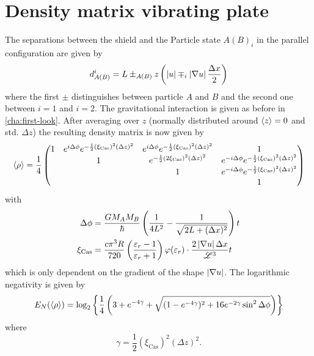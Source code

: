 \section{Density matrix vibrating plate} \label{apx:density-matrix-vibrating-plate}
The separations between the shield and the Particle state $A(B)_i$ in the parallel configuration are given by
\begin{equation}
  d^i_{A(B)} = L \pm_{A(B)} z \left(\left\lvert u\right\rvert \mp_i \left\lvert\nabla u\right\rvert \frac{\Delta x}{2}\right)
\end{equation}
where the first $\pm$ distinguishes between particle $A$ and $B$ and the second one between $i=1$ and $i=2$. The gravitational interaction is given as before in \cref{cha:first-look}.
After averaging over $z$ (normally distributed around $\left\langle z\right\rangle = 0$ and std. $\Delta z$) the resulting density matrix is now given by
\begin{equation}
  \left\langle\rho\right\rangle = \frac{1}{4} \begin{pmatrix}
    1 & e^{i \Delta \phi} e^{- \frac{1}{2} (\xi_\mathrm{Cas})^2 (\Delta z)^2} & e^{i \Delta \phi} e^{- \frac{1}{2} (\xi_\mathrm{Cas})^2 (\Delta z)^2} & 1 \\
    & 1 & e^{- \frac{1}{2} (2 \xi_\mathrm{Cas})^2 (\Delta z)^2} & e^{-i \Delta \phi} e^{- \frac{1}{2} (\xi_\mathrm{Cas})^2(\Delta z)^2} \\
    & & 1 & e^{-i \Delta \phi} e^{- \frac{1}{2} (\xi_\mathrm{Cas})^2 (\Delta z)^2} \\
    & & & 1
  \end{pmatrix}
\end{equation}
with
\begin{align}
  \Delta \phi &= \frac{G M_A M_B}{\hbar} \left(\frac{1}{4L^2} - \frac{1}{\sqrt{2L + (\Delta x)^2}}\right) t \\
  \xi_\mathrm{Cas} &= \frac{c \pi^3 R}{720} \left(\frac{\varepsilon_r - 1}{\varepsilon_r + 1}\right)\varphi(\varepsilon_r)\cdot \frac{2 \left\lvert\nabla u\right\rvert \Delta x}{\mathscr{L}^3} t
\end{align}
which is only dependent on the gradient of the shape $\left\lvert\nabla u\right\rvert$.
The logarithmic negativity is given by
\begin{equation}\label{eq:apx:en-thermal-shield}
  E_N(\left\langle\rho\right\rangle) = \log_2\left\{\frac{1}{4}\left(3 + e^{-4 \gamma}+\sqrt{(1-e^{-4\gamma})^2 + 16e^{-2\gamma}\sin^2\Delta\phi}\right)\right\}
\end{equation}
where 
\begin{equation}
  \gamma = \frac{1}{2}(\xi_\mathrm{Cas})^2(\Delta z)^2 .
\end{equation}


